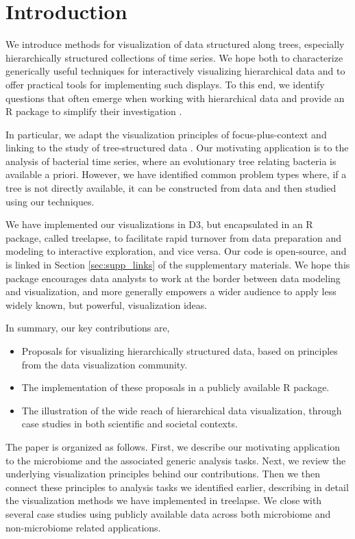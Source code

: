 \documentclass[12pt]{article}
\begin{document}
\newpage
{} %

\section{Introduction}\label{introduction}

We introduce methods for visualization of data structured along trees,
especially hierarchically structured collections of time series. We hope both to
characterize generically useful techniques for interactively visualizing
hierarchical data and to offer practical tools for implementing such displays.
To this end, we identify questions that often emerge when working with
hierarchical data and provide an R package to simplify their investigation
\citep{ihaka1996r}.

In particular, we adapt the visualization principles of focus-plus-context and
linking to the study of tree-structured data \citep{buja1996interactive,
  becker1987brushing}. Our motivating application is to the analysis of
bacterial time series, where an evolutionary tree relating bacteria is available
a priori. However, we have identified common problem types where, if a tree is
not directly available, it can be constructed from data and then studied using
our techniques.

We have implemented our visualizations in D3, but encapsulated in an R package,
called treelapse, to facilitate rapid turnover from data preparation and
modeling to interactive exploration, and vice versa. Our code is open-source,
and is linked in Section \ref{sec:supp_links} of the supplementary materials. We
hope this package encourages data analysts to work at the border between data
modeling and visualization, and more generally empowers a wider audience to
apply less widely known, but powerful, visualization ideas.

In summary, our key contributions are,
\begin{itemize}
\item Proposals for visualizing hierarchically structured data, based on
  principles from the data visualization community.
\item The implementation of these proposals in a publicly available R package.
\item The illustration of the wide reach of hierarchical data visualization,
  through case studies in both scientific and societal contexts.
\end{itemize}

The paper is organized as follows. First, we describe our motivating application
to the microbiome and the associated generic analysis tasks. Next, we review the
underlying visualization principles behind our contributions. Then we then
connect these principles to analysis tasks we identified earlier, describing in
detail the visualization methods we have implemented in treelapse. We close with
several case studies using publicly available data across both microbiome and
non-microbiome related applications.
\end{document}

